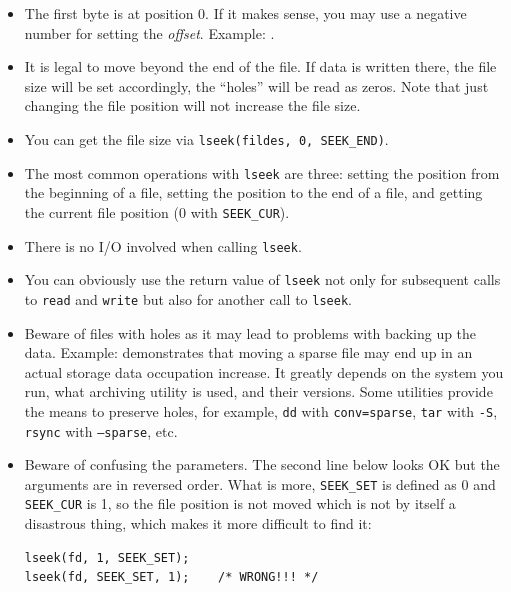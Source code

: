 \begin{itemize}
\item \label{LSEEK} The first byte is at position 0.  If it makes sense, you may
use a negative number for setting the \emph{offset}.  Example:
.
\item It is legal to move beyond the end of the file.  If data is written there,
the file size will be set accordingly, the ``holes'' will be read as zeros.
Note that just changing the file position will not increase the file size.
\item You can get the file size via \texttt{lseek(fildes, 0, SEEK\_END)}.
\item The most common operations with \texttt{lseek} are three: setting the
position from the beginning of a file, setting the position to the end of a
file, and getting the current file position (0 with \texttt{SEEK\_CUR}).
\item There is no I/O involved when calling \texttt{lseek}.
\item You can obviously use the return value of \texttt{lseek} not only for
subsequent calls to \texttt{read} and \texttt{write} but also for another call
to \texttt{lseek}.
\item \label{BIG_FILE} Beware of files with holes as it may lead to problems
with backing up the data.  Example:  demonstrates that
moving a sparse file may end up in an actual storage data occupation increase.
It greatly depends on the system you run, what archiving utility is used, and
their versions.  Some utilities provide the means to preserve holes, for example,
\texttt{dd} with \texttt{conv=sparse}, \texttt{tar} with \texttt{-S},
\texttt{rsync} with \texttt{--sparse}, etc.
\item Beware of confusing the parameters.  The second line below looks OK but
the arguments are in reversed order.  What is more, \texttt{SEEK\_SET} is
defined as 0 and \texttt{SEEK\_CUR} is 1, so the file position is not moved
which is not by itself a disastrous thing, which makes it more difficult to find
it:

\begin{verbatim}
lseek(fd, 1, SEEK_SET);
lseek(fd, SEEK_SET, 1);    /* WRONG!!! */
\end{verbatim}
\end{itemize}



